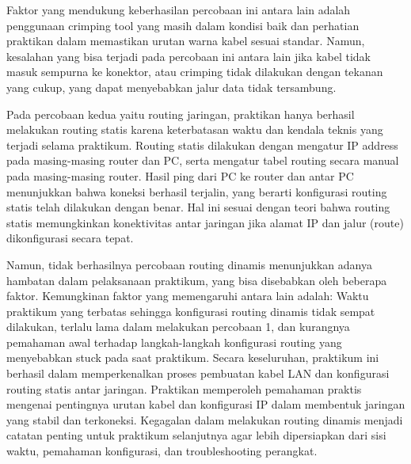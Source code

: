 Faktor yang mendukung keberhasilan percobaan ini antara lain adalah penggunaan crimping tool yang masih dalam kondisi baik dan perhatian praktikan dalam memastikan urutan warna kabel sesuai standar. Namun, kesalahan yang bisa terjadi pada percobaan ini antara lain jika kabel tidak masuk sempurna ke konektor, atau crimping tidak dilakukan dengan tekanan yang cukup, yang dapat menyebabkan jalur data tidak tersambung.

Pada percobaan kedua yaitu routing jaringan, praktikan hanya berhasil melakukan routing statis karena keterbatasan waktu dan kendala teknis yang terjadi selama praktikum. Routing statis dilakukan dengan mengatur IP address pada masing-masing router dan PC, serta mengatur tabel routing secara manual pada masing-masing router. Hasil ping dari PC ke router dan antar PC menunjukkan bahwa koneksi berhasil terjalin, yang berarti konfigurasi routing statis telah dilakukan dengan benar. Hal ini sesuai dengan teori bahwa routing statis memungkinkan konektivitas antar jaringan jika alamat IP dan jalur (route) dikonfigurasi secara tepat.

Namun, tidak berhasilnya percobaan routing dinamis menunjukkan adanya hambatan dalam pelaksanaan praktikum, yang bisa disebabkan oleh beberapa faktor. Kemungkinan faktor yang memengaruhi antara lain adalah: Waktu praktikum yang terbatas sehingga konfigurasi routing dinamis tidak sempat dilakukan, terlalu lama dalam melakukan percobaan 1, dan kurangnya pemahaman awal terhadap langkah-langkah konfigurasi routing yang menyebabkan stuck pada saat praktikum.
Secara keseluruhan, praktikum ini berhasil dalam memperkenalkan proses pembuatan kabel LAN dan konfigurasi routing statis antar jaringan. Praktikan memperoleh pemahaman praktis mengenai pentingnya urutan kabel dan konfigurasi IP dalam membentuk jaringan yang stabil dan terkoneksi. Kegagalan dalam melakukan routing dinamis menjadi catatan penting untuk praktikum selanjutnya agar lebih dipersiapkan dari sisi waktu, pemahaman konfigurasi, dan troubleshooting perangkat.

